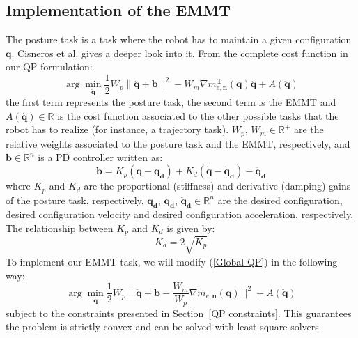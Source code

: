\documentclass[conference]{IEEEtran}
\begin{document}
\subsection{Implementation of the EMMT}
\noindent
The posture task is a task where the robot has to maintain a given configuration $\mathbf{q}$. Cisneros et al. \cite{cisnerosRobustHumanoidControl2018} gives a deeper look into it. 
From the complete cost function in our QP formulation:
\begin{equation}
    \arg \min_{\mathbf{\ddot q}} \frac{1}{2}W_{p}\| \mathbf{\ddot q} + \mathbf{b}\|^2 - W_m \nabla m_{e,\mathbf{n}}^
\mathbf{T}(\mathbf{q}) \mathbf{\ddot q} + A(\mathbf{\ddot q})
\label{Global QP}
\end{equation}
the first term represents the posture task, the second term is the EMMT and $A(\mathbf{\ddot q}) \in \mathbb{R}$ is the cost function associated to the other possible tasks that the robot has to realize (for instance, a trajectory task). $W_p$, $W_m \in \mathbb{R^+}$  are the relative weights associated to the posture task and the EMMT, respectively, and $\mathbf{b} \in \mathbb{R}^n$ is a PD controller written as: 
\begin{equation}
    \mathbf{b} = K_p(\mathbf{q - q_d}) + K_d(\mathbf{\dot q - \dot q_d}) - \mathbf{\ddot  q_d}
\label{PD controller}
\end{equation}
where $K_p$ and $K_d$ are the proportional (stiffness) and derivative (damping) gains of the posture task, respectively, $\mathbf{q_d}$, $\mathbf{\dot q_d}$, $\mathbf{\ddot q_d} \in \mathbb{R}^n$ are the desired configuration, desired configuration velocity and desired configuration acceleration, respectively.\\
The relationship between $K_p$ and $K_d$ is given by:
\begin{equation}
    K_d = 2\sqrt{K_p}
\label{Kp Kd relationship}
\end{equation}
To implement our EMMT task, we will modify (\ref{Global QP}) in the following way:
\begin{equation}
     \arg \min_{\mathbf{\ddot q}} \frac{1}{2}W_p \|\mathbf{\ddot q +b} - \frac{W_m}{W_p} \nabla m_{e, \mathbf{n}}(\mathbf{q}) \|^2 + A(\mathbf{\ddot q})
\label{Trick}
\end{equation}
subject to the constraints presented in Section~\ref{QP constraints}. 
This guarantees the problem is strictly convex and can be solved with least square solvers.
\end{document}
